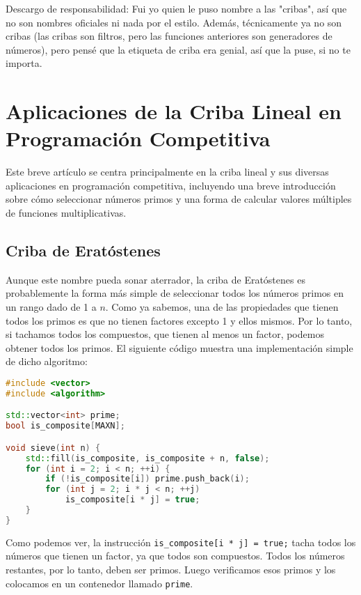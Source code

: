 \documentclass[11pt]{scrartcl}
\begin{document}
Descargo de responsabilidad: Fui yo quien le puso nombre a las "cribas", así que no son nombres oficiales ni nada por el estilo. Además, técnicamente ya no son cribas (las cribas son filtros, pero las funciones anteriores son generadores de números), pero pensé que la etiqueta de criba era genial, así que la puse, si no te importa.


\section*{Aplicaciones de la Criba Lineal en Programación Competitiva}

Este breve artículo se centra principalmente en la criba lineal y sus diversas aplicaciones en programación competitiva, incluyendo una breve introducción sobre cómo seleccionar números primos y una forma de calcular valores múltiples de funciones multiplicativas.

\subsection*{Criba de Eratóstenes}

Aunque este nombre pueda sonar aterrador, la criba de Eratóstenes es probablemente la forma más simple de seleccionar todos los números primos en un rango dado de 1 a \(n\). Como ya sabemos, una de las propiedades que tienen todos los primos es que no tienen factores excepto 1 y ellos mismos. Por lo tanto, si tachamos todos los compuestos, que tienen al menos un factor, podemos obtener todos los primos. El siguiente código muestra una implementación simple de dicho algoritmo:

\begin{lstlisting}[language=C++,caption=Criba de Eratóstenes]
#include <vector>
#include <algorithm>

std::vector<int> prime;
bool is_composite[MAXN];

void sieve(int n) {
    std::fill(is_composite, is_composite + n, false);
    for (int i = 2; i < n; ++i) {
        if (!is_composite[i]) prime.push_back(i);
        for (int j = 2; i * j < n; ++j)
            is_composite[i * j] = true;
    }
}
\end{lstlisting}

Como podemos ver, la instrucción \texttt{is\_composite[i * j] = true;} tacha todos los números que tienen un factor, ya que todos son compuestos. Todos los números restantes, por lo tanto, deben ser primos. Luego verificamos esos primos y los colocamos en un contenedor llamado \texttt{prime}.
\end{document}
